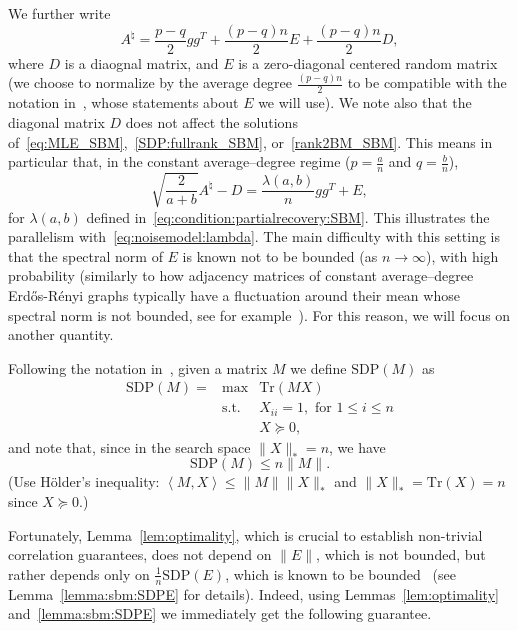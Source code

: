 \documentclass{colt2016} %
\newcommand{\ER}{{Erd\H{o}s-R\'enyi }}
\newcommand{\inner}[2]{\left\langle{#1},{#2}\right\rangle}
\newcommand{\trace}{\mathrm{Tr}}
\newcommand{\1}{\mathbf{1}}
\begin{document}
We further write
\begin{equation}\label{eq:def:E}
A^\natural = \frac{p-q}{2}gg^T + \frac{(p-q)n}{2}E + \frac{(p-q)n}{2}D,
\end{equation}
where $D$ is a diaognal matrix, and $E$ is a zero-diagonal centered random matrix (we choose to normalize by the average degree $\frac{(p-q)n}{2}$ to be compatible with the notation in~\citep{Montanari_SDPdetectionSBM}, whose statements about $E$ we will use). We note also that the diagonal matrix $D$ does not affect the solutions of~\eqref{eq:MLE_SBM},~\eqref{SDP:fullrank_SBM}, or~\eqref{rank2BM_SBM}. This means in particular that, in the constant average--degree regime ($p=\frac{a}n$ and $q=\frac{b}{n}$),
\[
\sqrt{\frac2{a+b}}A^\natural - D = \frac{\lambda(a,b)}n gg^T + E,
\]
for $\lambda(a,b)$ defined in~\eqref{eq:condition:partialrecovery:SBM}. This illustrates the parallelism with~\eqref{eq:noisemodel:lambda}. The main difficulty with this setting is that the spectral norm of $E$ is known not to be bounded (as $n\to\infty$), with high probability (similarly to how adjacency matrices of constant average--degree \ER graphs typically have a fluctuation around their mean whose spectral norm is not bounded, see for example~\citep{Krivelevich_Sudakov_ER,Montanari_SDPdetectionSBM}). For this reason, we will focus on another quantity. 

Following the notation in~\citep{Montanari_SDPdetectionSBM}, given a matrix $M$ we define $\mathrm{SDP}(M)$ as
\begin{equation}\label{def:SDP:eq}
\begin{array}{lll}
\mathrm{SDP}(M)
= &\max & \trace\left( M X \right) \\
& \text{s.t.} & X_{ii} = 1, \text{ for } 1\leq i \leq n\\ 
 & & X \succeq 0,
\end{array}
\end{equation}
and note that, since in the search space $\|X\|_\ast = n$, we have
\begin{equation}\label{SDP:eq:inequality}
\mathrm{SDP}(M) \leq n\|M\|.
\end{equation}
(Use H\"older's inequality: $\inner{M}{X} \leq \|M\|\|X\|_*$ and $\|X\|_* = \trace(X) = n$ since $X\succeq 0$.)

Fortunately, Lemma~\ref{lem:optimality}, which is crucial to establish non-trivial correlation guarantees, does not depend on $\|E\|$, which is not bounded, but rather depends only on $\frac1n\mathrm{SDP}(E)$, which is known to be bounded~\citep{Montanari_SDPdetectionSBM} (see Lemma~\ref{lemma:sbm:SDPE} for details). Indeed, using Lemmas~\ref{lem:optimality} and~\ref{lemma:sbm:SDPE} we immediately get the following guarantee.
\end{document}
